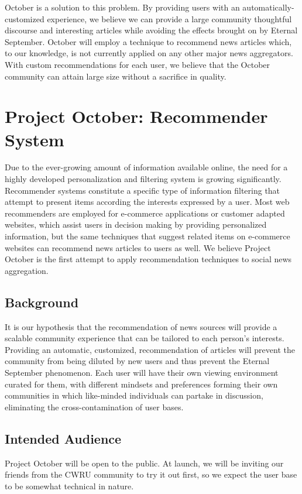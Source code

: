 \documentclass[11pt,letterpaper,titlepage]{article}
\begin{document}
October is a solution to this problem.
By providing users with an automatically-customized experience, we believe we can provide a large community thoughtful discourse and interesting articles while avoiding the effects brought on by Eternal September.
October will employ a technique to recommend news articles which, to our knowledge, is not currently applied on any other major news aggregators.
With custom recommendations for each user, we believe that the October  community can attain large size without a sacrifice in quality.

\newpage


\section{Project October: Recommender System}

Due to the ever-growing amount of information available online, the need for a highly developed personalization and filtering system is growing significantly.
Recommender systems constitute a specific type of information filtering that
attempt to present items according the interests expressed by a user.
Most web recommenders are employed for e-commerce applications or customer
adapted websites, which assist users in decision making by providing
personalized information, but the same techniques that
suggest related items on e-commerce websites can recommend news articles to users as well.
We believe Project October is the first attempt to apply recommendation techniques to social news aggregation.

\subsection{Background}
It is our hypothesis that the recommendation of news sources will provide a scalable community experience that can be tailored to each person's interests.
Providing an automatic, customized, recommendation of articles will prevent the community from being diluted by new users and thus prevent the Eternal September phenomenon.
Each user will have their own viewing environment curated for them, with different mindsets and preferences forming their own communities in which like-minded individuals can partake in discussion, eliminating the cross-contamination of user bases.


\subsection{Intended Audience}
Project October will be open to the public.
At launch, we will be inviting our friends from the CWRU community to try it out first, so we expect the user base to be somewhat technical in nature.
\end{document}
